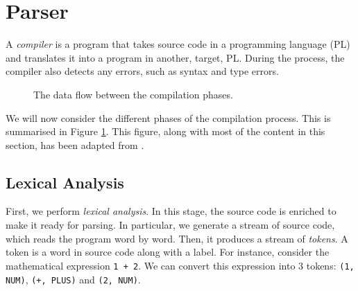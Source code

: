 \section{Parser}
A \emph{compiler} is a program that takes source code in a programming language (PL) and translates it into a program in another, target, PL. During the process, the compiler also detects any errors, such as syntax and type errors. 

\begin{figure}[htb]
    \centering
    \caption{The data flow between the compilation phases.}
    \label{fig:compilation_process}
\end{figure}

We will now consider the different phases of the compilation process. This is summarised in Figure \ref{fig:compilation_process}. This figure, along with most of the content in this section, has been adapted from \cite{aho2007compilers}.

\subsection{Lexical Analysis}    
First, we perform \emph{lexical analysis}. In this stage, the source code is enriched to make it ready for parsing. In particular, we generate a stream of source code, which reads the program word by word. Then, it produces a stream of \emph{tokens}. A token is a word in source code along with a label. For instance, consider the mathematical expression \texttt{1 + 2}. We can convert this expression into 3 tokens: \texttt{(1, NUM)}, \texttt{(+, PLUS)} and \texttt{(2, NUM)}. 

